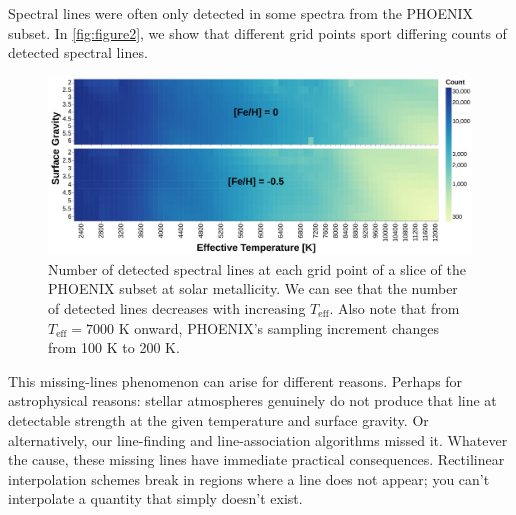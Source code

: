 \documentclass[twocolumn]{aastex631}
\begin{document}
Spectral lines were often only detected in some spectra from the PHOENIX subset. 
In \autoref{fig:figure2}, we show that different grid points sport differing counts of detected spectral lines.
\begin{figure}
    \centering
    \includegraphics[width=\textwidth]{figure2}
    \caption{Number of detected spectral lines at each grid point of a slice of the PHOENIX subset at solar metallicity. 
    We can see that the number of detected lines decreases with increasing $T_{\mathrm{eff}}$.
    Also note that from $T_{\mathrm{eff}} = 7000$ K onward, PHOENIX's sampling increment changes from 100 K to 200 K.}
    \label{fig:figure2}
\end{figure}

This missing-lines phenomenon can arise for different reasons.
Perhaps for astrophysical reasons: stellar atmospheres genuinely do not produce that line at detectable strength at the given temperature and surface gravity. 
Or alternatively, our line-finding and line-association algorithms missed it. 
Whatever the cause, these missing lines have immediate practical consequences. 
Rectilinear interpolation schemes break in regions where a line does not appear; you can't interpolate a quantity that simply doesn't exist.
\end{document}
